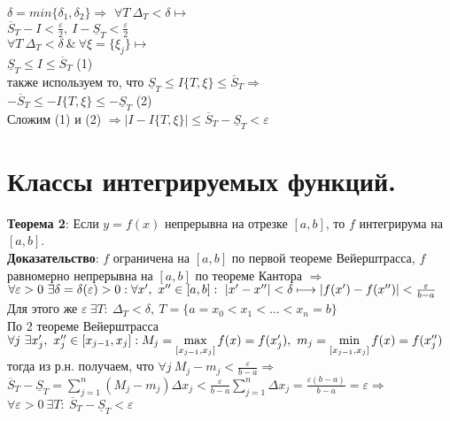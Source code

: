 \documentclass[a4paper,12pt]{article} %
\begin{document}
$\delta=min\{\delta_1,\delta_2\}\Rightarrow$
$\forall T~\Delta_T<\delta \longmapsto$\\
$\overline{S}_T-I<\frac{\varepsilon}{2},~I-\underline{S}_T<\frac{\varepsilon}{2}$\\
$\forall T~\Delta_T<\delta~\&~\forall \xi=\{\xi_j\}\longmapsto$\\
$\underline{S}_T\leq I\leq \overline{S}_T$ (1)\\
также используем то, что $\underline{S}_T\leq I\{T,\xi\}\leq \overline{S}_T\Rightarrow$\\
$-\overline{S}_T\leq -I\{T,\xi\}\leq -\underline{S}_T$ (2)\\
Сложим (1) и (2) $\Rightarrow |I-I\{T,\xi\}|\leq \overline{S}_T-\underline{S}_T<\varepsilon$\\
\section*{Классы интегрируемых функций.}

\noindent \textbf{Теорема 2}: Если $y=f(x)$ непрерывна на отрезке $[a,b]$, то $f$ интегрирума на $[a,b]$.\\
\noindent \textbf{Доказательство}: $f$ ограничена на $[a,b]$ по первой теореме Вейерштрасса, $f$ равномерно непрерывна на $[a,b]$ по теореме Кантора $\Rightarrow$\\
$\forall\varepsilon>0~\exists\delta=\delta(\varepsilon)>0: \forall x^{\prime},~x^{\prime\prime} \in [a,b]:~|x^{\prime}-x^{\prime\prime}|<\delta \longmapsto\\|f(x^{\prime})-f(x^{\prime\prime})|<\frac{\varepsilon}{b-a}$\\
Для этого же $\varepsilon~\exists T:~\Delta_T<\delta,~T=\{a=x_0<x_1<{\dots}<x_n=b\}$\\
По 2 теореме Вейерштрасса $\forall j~\exists x^{\prime}_j,~x^{\prime\prime}_j\in [x_{j-1},x_j]:~\\
M_j=\max\limits_{[x_{j-1},x_j]}{f(x)}=f(x^{\prime}_j),~m_j=\min\limits_{[x_{j-1},x_j]}{f(x)}=f(x^{\prime\prime}_j)$\\
тогда из р.н. получаем, что $\forall j~M_j-m_j<\frac{\varepsilon}{b-a}\Rightarrow$\\
$\overline{S}_T-\underline{S}_T=\sum^{n}_{j=1}{(M_j-m_j)\Delta x_j}<\frac{\varepsilon}{b-a}\sum^{n}_{j=1}{\Delta x_j}=\frac{\varepsilon(b-a)}{b-a}=\varepsilon\Rightarrow$\\
$\forall\varepsilon>0~\exists T:~\overline{S}_T-\underline{S}_T<\varepsilon$\\
\end{document}
